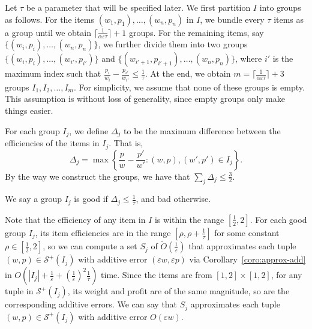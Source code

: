 \documentclass[a4paper,UKenglish,cleveref, autoref, thm-restate, pdfa]{lipics-v2021}
\newcommand{\eps}{\varepsilon}
\renewcommand{\leq}{\leqslant}
\begin{document}
Let $\tau$ be a parameter that will be specified later.  We first partition $I$ into groups as follows. For the items $(w_1, p_1), \ldots, (w_n, p_n)$ in $I$, we bundle every $\tau$ items as a group until we obtain $\lceil\frac{1}{\alpha\eps\tau}\rceil + 1$ groups. For the remaining items, say $\{(w_i, p_i), \ldots, (w_n, p_n)\}$, we further divide them into two groups $\{(w_i, p_i), \ldots, (w_{i'}, p_{i'})\}$ and $\{(w_{i'+ 1}, p_{i'+1}), \ldots, (w_n, p_n)\}$, where $i'$ is the maximum index such that $\frac{p_i}{w_i} - \frac{p_{i'}}{w_{i'}} \leq \frac{1}{\tau}$. At the end, we obtain $m = \lceil\frac{1}{\alpha\eps\tau}\rceil + 3$ groups $I_1, I_2, \ldots, I_m$. For simplicity, we assume that none of these groups is empty. This assumption is without loss of generality, since empty groups only make things easier.

For each group $I_j$, we define $\Delta_j$ to be the maximum difference between the efficiencies of the items in $I_j$. That is,
\[
    \Delta_j = \max\left\{\frac{p}{w} - \frac{p'}{w'} : (w, p), (w', p') \in I_j\right\}. 
\]
By the way we construct the groups, we have that $\sum_j \Delta_j \leq \frac{3}{2}$.  

We say a group $I_j$ is good if $\Delta_j \leq \frac{1}{\tau}$, and bad otherwise. 

Note that the efficiency of any item in $I$ is within the range $[\frac{1}{2}, 2]$. For each good group $I_j$, its item efficiencies are in the range $[\rho, \rho + \frac{1}{\tau}]$ for some constant $\rho \in [\frac{1}{2},2]$, so we can compute a set $S_j$ of $\tilde{O}(\frac{1}{\eps})$ that approximates each tuple $(w, p) \in \mathcal{S}^+(I_j)$ with additive error $(\eps w, \eps p)$ via Corollary~\ref{coro:approx-add} in $O(|I_j| + \frac{1}{\eps} + (\frac{1}{\eps})^2\frac{1}{\tau})$ time. Since the items are from $[1,2]\times [1,2]$, for any tuple in $\mathcal{S}^+(I_j)$, its weight and profit are of the same magnitude, so are the corresponding additive errors. We can say that $S_j$ approximates each tuple $(w, p) \in \mathcal{S}^+(I_j)$ with additive error $O(\eps w)$.
\end{document}
